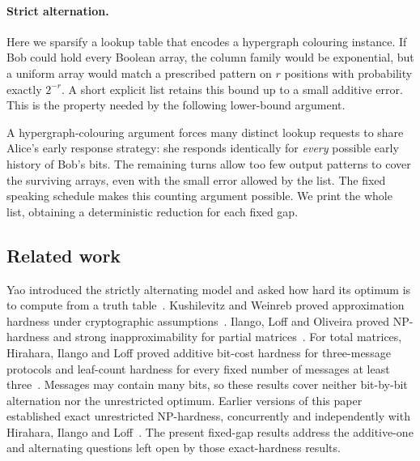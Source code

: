 \documentclass[11pt]{article} \usepackage[utf8]{inputenc}
\theoremstyle{plain} \newtheorem{theorem}{Theorem}[section]
\theoremstyle{definition} \newaliascnt{definition}{theorem}
\begin{document}
\paragraph{Strict alternation.}
Here we sparsify a lookup table that encodes a hypergraph colouring
instance. If Bob could hold every Boolean array, the
column family would be exponential, but a uniform array would match a
prescribed pattern on $r$ positions with probability exactly $2^{-r}$.
A short explicit list retains this bound up to a small additive error.
This is the property needed by the following lower-bound argument.

A hypergraph-colouring argument forces many distinct lookup requests to
share Alice's early response strategy: she responds identically for
\emph{every} possible early history of Bob's bits. The remaining turns
allow too few output patterns to cover the surviving arrays, even with
the small error allowed by the list. The fixed speaking schedule makes
this counting argument possible. We print the whole list, obtaining a
deterministic reduction for each fixed gap.

\subsection{Related work}

Yao introduced the strictly alternating model and asked how hard its optimum
is to compute from a truth table~\cite{yao1979distributed}.
Kushilevitz and Weinreb proved approximation hardness under cryptographic
assumptions~\cite{kushilevitz2009complexity}. Ilango, Loff and Oliveira
proved NP-hardness and strong inapproximability for partial
matrices~\cite{ilango2020multioutput}. For total matrices, Hirahara,
Ilango and Loff proved additive bit-cost hardness for three-message protocols
and leaf-count hardness for every fixed number of messages at least
three~\cite{hirahara2021constant}. Messages may contain many bits, so
these results cover neither bit-by-bit alternation nor the unrestricted
optimum. Earlier versions of this paper~\cite{gaspers-he-mackenzie-npcc}
established exact unrestricted NP-hardness, concurrently and independently
with Hirahara, Ilango and Loff~\cite{hirahara2025communication}. The present
fixed-gap results address the additive-one and alternating questions left
open by those exact-hardness results.
\end{document}

